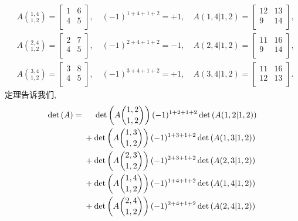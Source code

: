\documentclass[%
    UTF8,%
    fontset=none,%
    punct=kaiming,%
    zihao=-4,%
    a4paper,%
    oneside,%
]{ctexbook}
\begin{document}
\begin{example}
\begin{align*}
         & A\binom{1,4}{1,2}
        = \begin{bmatrix}1&6\\4&5\\ \end{bmatrix},
        \quad
        (-1)^{1+4+1+2} = +1,
        \quad
        A(1,4|1,2)
        = \begin{bmatrix}12&13\\9&14\\ \end{bmatrix},  \\
         & A\binom{2,4}{1,2}
        = \begin{bmatrix}2&7\\4&5\\ \end{bmatrix},
        \quad
        (-1)^{2+4+1+2} = -1,
        \quad
        A(2,4|1,2)
        = \begin{bmatrix}11&16\\9&14\\ \end{bmatrix},  \\
         & A\binom{3,4}{1,2}
        = \begin{bmatrix}3&8\\4&5\\ \end{bmatrix},
        \quad
        (-1)^{3+4+1+2} = +1,
        \quad
        A(3,4|1,2)
        = \begin{bmatrix}11&16\\12&13\\ \end{bmatrix}.
    \end{align*}
    定理告诉我们,
    \begin{align*}
        \det {(A)}
        = {} & \hphantom{{} + {}}
        \det {\left( A\binom{1,2}{1,2} \right)}\,
        (-1)^{1+2+1+2} \det {(A(1,2|1,2))}
        \\
             & + \det {\left( A\binom{1,3}{1,2} \right)}\,
        (-1)^{1+3+1+2} \det {(A(1,3|1,2))}
        \\
             & + \det {\left( A\binom{2,3}{1,2} \right)}\,
        (-1)^{2+3+1+2} \det {(A(2,3|1,2))}
        \\
             & + \det {\left( A\binom{1,4}{1,2} \right)}\,
        (-1)^{1+4+1+2} \det {(A(1,4|1,2))}
        \\
             & + \det {\left( A\binom{2,4}{1,2} \right)}\,
        (-1)^{2+4+1+2} \det {(A(2,4|1,2))}
        \\

\end{align*}
\end{example}
\end{document}
